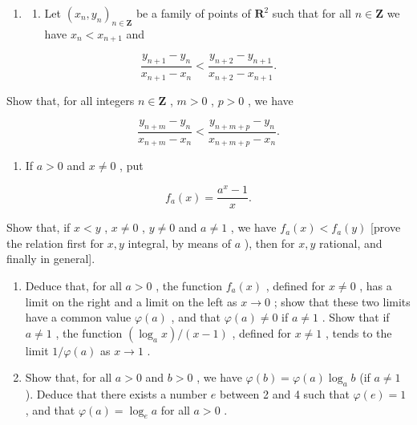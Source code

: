 \ExerciseSection

\begin{enumerate}
\def\labelenumi{\arabic{enumi})}
\tightlist
\item
  \begin{enumerate}
  \def\labelenumii{\alph{enumii})}
  \tightlist
  \item
    Let \((x_{n}, y_{n})_{n \in \mathbf{Z}}\) be a family of points of \(\mathbf{R}^{2}\) such that for all \(n \in \mathbf{Z}\) we have \(x_{n} < x_{n+1}\) and
  \end{enumerate}
\end{enumerate}

\[
\frac {y _ {n + 1} - y _ {n}}{x _ {n + 1} - x _ {n}} <   \frac {y _ {n + 2} - y _ {n + 1}}{x _ {n + 2} - x _ {n + 1}}.
\]

Show that, for all integers \(n \in \mathbf{Z}\) , \(m > 0\) , \(p > 0\) , we have

\[
\frac {y _ {n + m} - y _ {n}}{x _ {n + m} - x _ {n}} <   \frac {y _ {n + m + p} - y _ {n}}{x _ {n + m + p} - x _ {n}}.
\]

\begin{enumerate}
\def\labelenumi{\alph{enumi})}
\setcounter{enumi}{1}
\tightlist
\item
  If \(a > 0\) and \(x \neq 0\) , put
\end{enumerate}

\[
f _ {a} (x) = \frac {a ^ {x} - 1}{x}.
\]

Show that, if \(x < y\) , \(x \neq 0\) , \(y \neq 0\) and \(a \neq 1\) , we have \(f_{a}(x) < f_{a}(y)\) {[}prove the relation first for \(x, y\) integral, by means of \(a\) ), then for \(x, y\) rational, and finally in general{]}.

\begin{enumerate}
\def\labelenumi{\alph{enumi})}
\setcounter{enumi}{2}
\item
  Deduce that, for all \(a > 0\) , the function \(f_{a}(x)\) , defined for \(x \neq 0\) , has a limit on the right and a limit on the left as \(x \to 0\) ; show that these two limits have a common value \(\varphi(a)\) , and that \(\varphi(a) \neq 0\) if \(a \neq 1\) . Show that if \(a \neq 1\) , the function \((\log_{a} x) / (x - 1)\) , defined for \(x \neq 1\) , tends to the limit \(1 / \varphi(a)\) as \(x \to 1\) .
\item
  Show that, for all \(a > 0\) and \(b > 0\) , we have \(\varphi(b) = \varphi(a) \log_a b\) (if \(a \neq 1\) ). Deduce that there exists a number \(e\) between 2 and 4 such that \(\varphi(e) = 1\) , and that \(\varphi(a) = \log_e a\) for all \(a > 0\) .
\end{enumerate}

